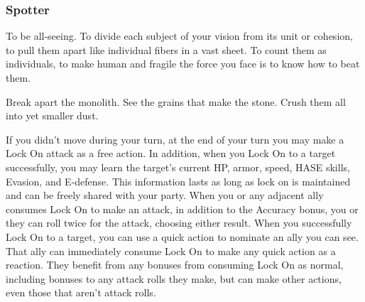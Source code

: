 \subsubsection{Spotter}

\begin{talent}
{To be all-seeing. To divide each subject of your vision from its unit or cohesion, to pull them apart like individual fibers in a vast sheet. To count them as individuals, to make human and fragile the force you face is to know how to beat them.

Break apart the monolith. See the grains that make the stone. Crush them all into yet smaller dust.} 

If you didn't move during your turn, at the end of your turn you may make a Lock On attack as a free action. In addition, when you Lock On to a target successfully, you may learn the target's current HP, armor, speed, HASE skills, Evasion, and E-defense. This information lasts as long as lock on is maintained and can be freely shared with your party. 
When you or any adjacent ally consumes Lock On to make an attack, in addition to the Accuracy bonus, you or they can roll twice for the attack, choosing either result. 
When you successfully Lock On to a target, you can use a quick action to nominate an ally you can see. That ally can immediately consume Lock On to make any quick action as a reaction. They benefit from any bonuses from consuming Lock On as normal, including bonuses to any attack rolls they make, but can make other actions, even those that aren't attack rolls.
\end{talent}